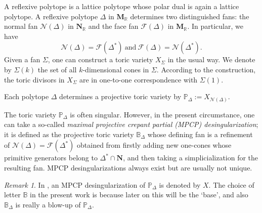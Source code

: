 \documentclass[12pt,a4paper,oneside]{amsart}
\numberwithin{equation}{section}
\theoremstyle{definition}
\theoremstyle{remark}
\newtheorem{rmk}[thm]{Remark}
\newcommand{\cP}{\mathbb{P}}
\newcommand{\cB}{\mathbb{B}}
\begin{document}
A reflexive polytope is a lattice polytope 
whose polar dual is again a lattice polytope.
A reflexive polytope \(\Delta\) in \(\mathbf{M}_{\mathbb{R}}\) 
determines two distinguished fans:
the normal fan \(\mathcal{N}(\Delta)\) in \(\mathbf{N}_{\mathbb{R}}\)
and the face fan \(\mathcal{F}(\Delta)\) in \(\mathbf{M}_{\mathbb{R}}\).
In particular, we have
\begin{equation*}
    \mathcal{N}(\Delta)=\mathcal{F}(\Delta^{\ast})~\mbox{and}~
    \mathcal{F}(\Delta)=\mathcal{N}(\Delta^{\ast}).
\end{equation*}
Given a fan \(\Sigma\), one can construct a toric variety \(X_{\Sigma}\)
in the usual way. We denote by \(\Sigma(k)\)
the set of all \(k\)-dimensional cones in \(\Sigma\).
According to the construction, the toric divisors in \(X_{\Sigma}\)
are in one-to-one correspondence with \(\Sigma(1)\).

Each polytope \(\Delta\) determines a projective 
toric variety by
\(\mathbb{P}_{\Delta}:=X_{\mathcal{N}(\Delta)}\). 


The toric variety \(\mathbb{P}_{\Delta}\)
is often singular. However, in the present circumstance, one can take a
so-called \emph{maximal projective crepant partial (MPCP) desingularization};
it is defined as the projective toric variety \(\cB_{\Delta}\) whose defining fan
is a refinement of \(\mathcal{N}(\Delta)=\mathcal{F}(\Delta^{\ast})\) obtained
from firstly adding new one-cones whose primitive generators belong to 
\(\Delta^{\ast}\cap \mathbf{N}\), and then taking a simplicialization
for the resulting fan. MPCP desingularizations always exist
but are usually not unique. 
\begin{rmk}
    In \cite{Lee:2020oyt,Lee:2023piu}, an MPCP desingularization
    of \(\mathbb{P}_{\Delta}\) %
    is denoted by \(X\). %
    The choice of letter \(\mathbb{B}\)
    in the present work 
    is because later on this will be the `base', and 
    also $\cB_{\Delta}$ is really a blow-up of $\cP_{\Delta}$.
\end{rmk}
\end{document}
